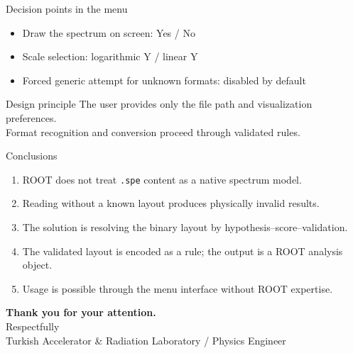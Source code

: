 \documentclass[aspectratio=169,11pt]{beamer}
\begin{document}
\begin{frame}{Decision points in the menu}
  \begin{itemize}
    \item Draw the spectrum on screen: Yes / No
    \item Scale selection: logarithmic Y / linear Y
    \item Forced generic attempt for unknown formats: disabled by default
  \end{itemize}

  \vspace{0.7em}
  \begin{exampleblock}{Design principle}
    The user provides only the file path and visualization preferences.\\
    Format recognition and conversion proceed through validated rules.
  \end{exampleblock}
\end{frame}

\begin{frame}{Conclusions}
  \begin{enumerate}
    \item ROOT does not treat \texttt{.spe} content as a native spectrum model.
    \item Reading without a known layout produces physically invalid results.
    \item The solution is resolving the binary layout by hypothesis--score--validation.
    \item The validated layout is encoded as a rule; the output is a ROOT analysis object.
    \item Usage is possible through the menu interface without ROOT expertise.
  \end{enumerate}
\end{frame}

\begin{frame}[plain]
  \begin{center}
    \vspace{2.2cm}
    {\Large\bfseries\textcolor{ustnavy}{Thank you for your attention.}}\\[1.4em]
    {\large\textcolor{ustgray}{Respectfully}}\\[1.2em]
    {\normalsize\textcolor{ustteal}{Turkish Accelerator \& Radiation Laboratory / Physics Engineer}}
  \end{center}
\end{frame}
\end{document}
